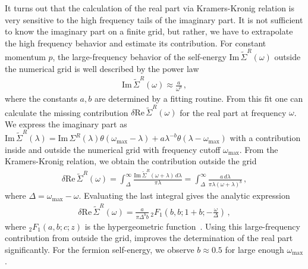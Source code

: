It turns out that the calculation of the real part via Kramers-Kronig relation is very sensitive to the high frequency tails of the imaginary part. It is not sufficient to know the imaginary part on a finite grid, but rather, we have to extrapolate the high frequency behavior and estimate its contribution. For constant momentum $p$, the large-frequency behavior of the self-energy $\mathrm{Im}\,\tilde{\Sigma}^{R}(\omega)$ outside the numerical grid is well described by the power law
%
\begin{align}
\mathrm{Im}\,\tilde{\Sigma}^{R}(\omega) \approx \frac{a}{\omega^b} \,,
\end{align}
%
where the constants $a,b$ are determined by a fitting routine. From this fit one can calculate the missing contribution $\delta\mathrm{Re}\,\tilde{\Sigma}^{R}(\omega)$ for the real part at frequency $\omega$. We express the imaginary part as $\mathrm{Im}\,\tilde{\Sigma}^{R}(\lambda) = \mathrm{Im}\,\Sigma^{R}(\lambda)\theta(\omega_{\mathrm{max}}-\lambda) + a\lambda^{-b} \theta(\lambda-\omega_{\mathrm{max}})$ with a contribution inside and outside the numerical grid with frequency cutoff $\omega_{\mathrm{max}}$. From the Kramers-Kronig relation, we obtain the contribution outside the grid
%
\begin{align}
	\delta\mathrm{Re}\,\tilde{\Sigma}^{R}(\omega) = \int_{\Delta}^{\infty}\frac{\mathrm{Im}\,\tilde{\Sigma}^{R}(\omega+\lambda)\,d\lambda}{\pi\lambda} = \int_{\Delta}^{\infty}\frac{a\,d\lambda}{\pi\lambda(\omega+\lambda)^b} \,,
\end{align}
%
where $\Delta=\omega_{\mathrm{max}}-\omega$. Evaluating the last integral gives the analytic expression
%
\begin{align}
\delta\mathrm{Re}\,\tilde{\Sigma}^{R}(\omega) = \frac{a}{\pi\Delta^b b}\,{}_{2}F_{1}\left(b,b;1+b;-\frac{\omega}{\Delta}\right) \,,
\end{align}
%
where ${}_{2}F_{1}\left(a,b;c;z\right)$ is the hypergeometric function~\cite{Abramowitz1972}. Using this large-frequency contribution from outside the grid, improves the determination of the real part significantly. For the fermion self-energy, we observe $b\approx 0.5$ for large enough $\omega_{\mathrm{max}}$.

